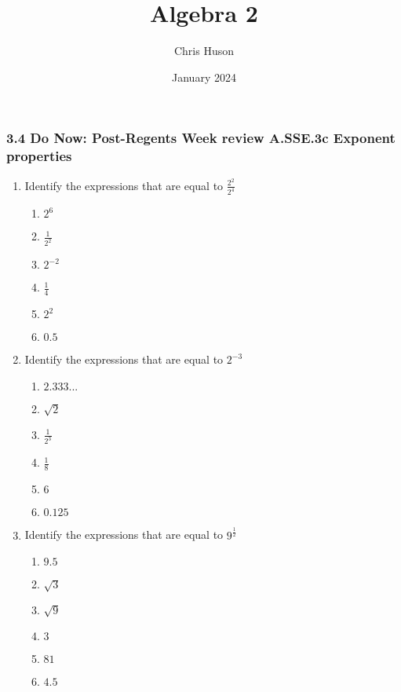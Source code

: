 \documentclass[12pt, twoside]{article}
\title{Algebra 2}
\author{Chris Huson}
\date{January 2024}
\begin{document}
\subsubsection*{3.4 Do Now: Post-Regents Week review \hfill A.SSE.3c Exponent properties}
\begin{enumerate}
\item Identify the expressions that are equal to $\displaystyle \frac{2^2}{2^4}$
    \begin{multicols}{2}
    \begin{enumerate}
        \item $2^6$
        \item $\displaystyle \frac{1}{2^2}$
        \item $2^{-2}$
        \item $\frac{1}{4}$
        \item $2^{2}$
        \item $0.5$
    \end{enumerate}
    \end{multicols}

\item Identify the expressions that are equal to $\displaystyle 2^{-3}$
    \begin{multicols}{2}
    \begin{enumerate}
        \item $2.333...$
        \item $\sqrt{2}$
        \item $\displaystyle \frac{1}{2^3}$
        \item $\displaystyle \frac{1}{8}$
        \item $6$
        \item $0.125$
    \end{enumerate}
    \end{multicols}

\item Identify the expressions that are equal to $\displaystyle 9^{\frac{1}{2}}$
    \begin{multicols}{2}
    \begin{enumerate}
        \item $9.5$
        \item $\sqrt{3}$
        \item $\sqrt{9}$
        \item $3$
        \item $81$
        \item $4.5$
    \end{enumerate}
    \end{multicols}


\end{enumerate}
\end{document}
